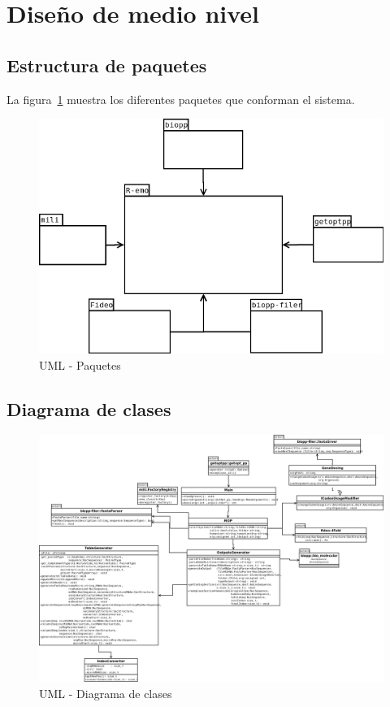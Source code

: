 \documentclass[12pt,a4paper,spanish]{article}
\begin{document}
\section{Diseño de medio nivel}
\label{middleLevel}
\subsection{Estructura de paquetes}
La figura~\ref{package} muestra los diferentes paquetes que conforman el sistema.
\begin{figure}
  \centering
  \includegraphics[scale=0.65]{image/packageDiagramHighGranularity.png}  
  \caption{UML - Paquetes}
  \label{package}
\end{figure}

\vskip 5cm

\subsection{Diagrama de clases}
\begin{figure}
  \centering
  \includegraphics[scale=0.35, angle=90]{image/ClassDiagram.png}  
  \caption{UML - Diagrama de clases}
  \label{clases}
\end{figure}
\end{document}
